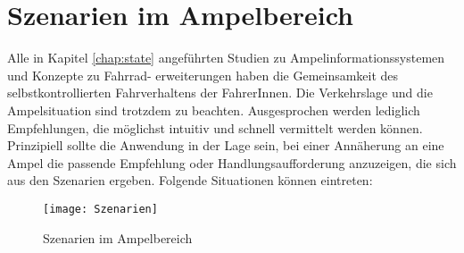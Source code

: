 \chapter{\label{chap:szenarien}Szenarien im Ampelbereich}
Alle in Kapitel \ref{chap:state} angeführten Studien zu Ampelinformationssystemen und Konzepte zu Fahrrad- erweiterungen haben die Gemeinsamkeit des selbstkontrollierten Fahrverhaltens der FahrerInnen. Die Verkehrslage und die Ampelsituation sind trotzdem zu beachten. Ausgesprochen werden lediglich Empfehlungen, die möglichst intuitiv und schnell vermittelt werden können.\\ 
Prinzipiell sollte die Anwendung in der Lage sein, bei einer Annäherung an eine Ampel die passende Empfehlung oder Handlungsaufforderung anzuzeigen, die sich aus den Szenarien ergeben. Folgende Situationen können eintreten:\\
\begin{figure}[H]  
    \centering  
    \texttt{[image: Szenarien]} 
    \grayRule
    \caption[Szenarien]{Szenarien im Ampelbereich}
    \label{fig:szenarien}
\end{figure} \vspace{17pt}

